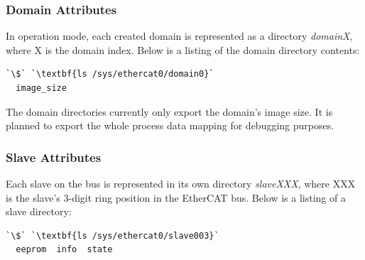 \documentclass[a4paper,12pt,BCOR6mm,bibtotoc,idxtotoc]{scrbook}
\begin{document}
\subsubsection{Domain Attributes}
\label{sec:sysfs-domain}

In operation mode, each created domain is represented as a directory
\textit{domainX}, where X is the domain index. Below is a listing of
the domain directory contents:

\begin{lstlisting}[gobble=2]
  `\$` `\textbf{ls /sys/ethercat0/domain0}`
  image_size
\end{lstlisting}

The domain directories currently only export the domain's image size.
It is planned to export the whole process data mapping for debugging
purposes.

\subsubsection{Slave Attributes}
\label{sec:sysfs-slave}

Each slave on the bus is represented in its own directory
\textit{slaveXXX}, where XXX is the slave's 3-digit ring position in
the EtherCAT bus. Below is a listing of a slave directory:

\begin{lstlisting}[gobble=2]
  `\$` `\textbf{ls /sys/ethercat0/slave003}`
  eeprom  info  state
\end{lstlisting}
\end{document}
